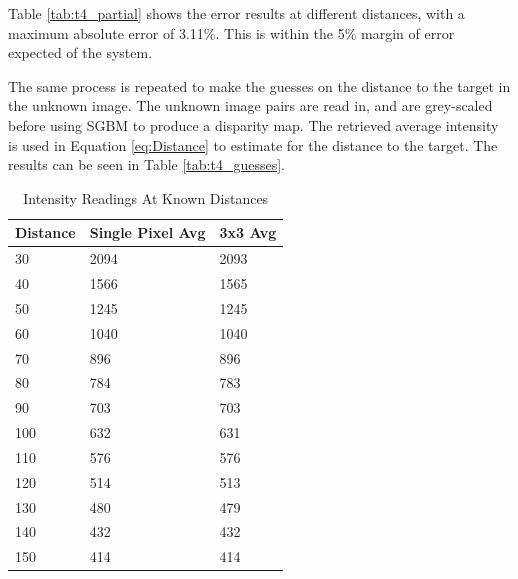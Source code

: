 \documentclass[conference]{IEEEtran}
\begin{document}
Table \ref{tab:t4_partial} shows the error results at different distances, with a maximum absolute error of 3.11\%. This is within the 5\% margin of error expected of the system.

The same process is repeated to make the guesses on the distance to the target in the unknown image. The unknown image pairs are read in, and are grey-scaled before using SGBM to produce a disparity map. The retrieved average intensity is used in Equation \ref{eq:Distance} to estimate for the distance to the target. The results can be seen in Table \ref{tab:t4_guesses}. 

\begin{table}[]
\caption{Intensity Readings At Known Distances}
\label{tab:intensity_results}
\begin{tabular}{|l|l|l|}
\hline
\textbf{Distance} & \textbf{Single Pixel Avg} & \textbf{3x3 Avg} \\ \hline
30                 & 2094 & 2093         \\ \hline
40                & 1566 & 1565         \\ \hline
50                 & 1245 & 1245         \\ \hline
60                 & 1040 & 1040         \\ \hline
70                 & 896 & 896         \\ \hline
80                & 784 & 783         \\ \hline
90                & 703 & 703         \\ \hline
100                 & 632 & 631          \\ \hline
110      & 576 & 576           \\ \hline
120      & 514 & 513         \\ \hline
130                 & 480 &479          \\ \hline
140				& 432	& 432	\\ \hline
150				&	414 & 414	\\ \hline
\end{tabular}
\end{table} 
\end{document}
